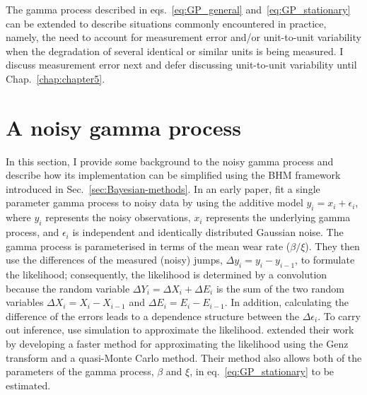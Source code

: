The gamma process described in eqs.~\eqref{eq:GP_general} and~\eqref{eq:GP_stationary} can be extended to describe situations commonly encountered in practice, namely, the need to account for measurement error and/or unit-to-unit variability when the degradation of several identical or similar units is being measured. I discuss measurement error next and defer discussing unit-to-unit variability until Chap.~\ref{chap:chapter5}.

\section{A noisy gamma process} \label{sec:NGP}

In this section, I provide some background to the noisy gamma process and describe how its implementation can be simplified using the BHM framework introduced in Sec.~\ref{sec:Bayesian-methods}. In an early paper, \citet{kallen2005} fit a single parameter gamma process to noisy data by using the additive model $y_i = x_i + \epsilon_i$, where $y_i$ represents the noisy observations, $x_i$ represents the underlying gamma process, and $\epsilon_i$ is independent and identically distributed Gaussian noise. The gamma process is parameterised in terms of the mean wear rate ($\beta / \xi $). They then use the differences of the measured (noisy) jumps, $\Delta y_i = y_i - y_{i-1}$, to formulate the likelihood; consequently, the likelihood is determined by a convolution because the random variable $\Delta Y_i = \Delta X_i + \Delta E_i$ is the sum of the two random variables $\Delta X_i = X_i - X_{i-1}$ and $\Delta E_i = E_i - E_{i-1}$. In addition, calculating the difference of the errors leads to a dependence structure between the $\Delta \epsilon_i$. To carry out inference, \citet{kallen2005} use simulation to approximate the likelihood. \citet{lu2013} extended their work by developing a faster method for approximating the likelihood using the Genz transform and a quasi-Monte Carlo method. Their method also allows both of the parameters of the gamma process, $\beta$ and $\xi$, in eq.~\eqref{eq:GP_stationary} to be estimated.

